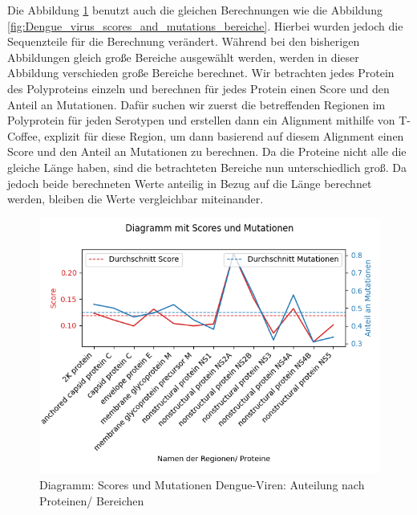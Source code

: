 \documentclass[german,version-2022-01]{uzl-thesis}
\begin{document}
Die Abbildung \ref{fig:Dengue_virus_scores_and_mutations_namen} benutzt auch die gleichen Berechnungen wie die Abbildung \ref{fig:Dengue_virus_scores_and_mutations_bereiche}. Hierbei wurden jedoch die Sequenzteile f\"ur die Berechnung ver\"andert. W\"ahrend bei den bisherigen Abbildungen gleich gro\ss{}e Bereiche ausgew\"ahlt werden, werden in dieser Abbildung verschieden gro\ss{}e Bereiche berechnet. Wir betrachten jedes Protein des Polyproteins einzeln und berechnen f\"ur jedes Protein einen Score und den Anteil an Mutationen. Daf\"ur suchen wir zuerst die betreffenden Regionen im Polyprotein f\"ur jeden Serotypen und erstellen dann ein Alignment mithilfe von T-Coffee, explizit f\"ur diese Region, um dann basierend auf diesem Alignment einen Score und den Anteil an Mutationen zu berechnen. Da die Proteine nicht alle die gleiche L\"ange haben, sind die betrachteten Bereiche nun unterschiedlich gro\ss{}. Da jedoch beide berechneten Werte anteilig in Bezug auf die L\"ange berechnet werden, bleiben die Werte vergleichbar miteinander. 
\begin{figure}[htpb]
  \centering
  \includegraphics[scale=0.75]{Images/Diagramm_Scores_und_Mutationen_Dengue_viren_Namen.png}
  \caption{Diagramm: Scores und Mutationen Dengue-Viren: Auteilung nach Proteinen/ Bereichen}
  \label{fig:Dengue_virus_scores_and_mutations_namen}
\end{figure}
\end{document}
